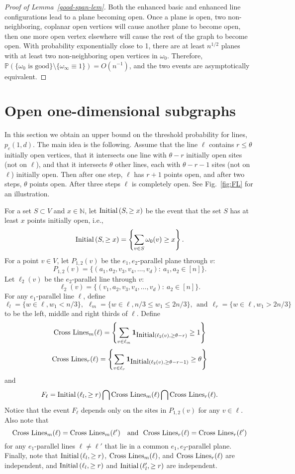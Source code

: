 \documentclass{amsart}
\newcommand{\one}{\mathbf{1}}
\newcommand{\prob}{\mathbb{P}}
\newcommand{\N}{\mathbb{N}}
\newcommand{\threshold}{\theta}
\newcommand{\noodle}{r}
\newcommand{\I}[2]{\hbox{Initial}\left(#1, \geq #2\right)}
\newcommand{\good}{\text{good}}
\newcommand{\Gone}[1]{\hbox{Cross Lines}_m(#1)}
\newcommand{\Gtwo}[1]{\hbox{Cross Lines}_r(#1)}
\numberwithin{equation}{section}
\newcommand{\Ln}{\ell}
\theoremstyle{definition}
\theoremstyle{remark}
\begin{document}
\begin{proof}[Proof of Lemma~\ref{good-span-lem}]
Both the enhanced basic and enhanced line configurations lead to a plane becoming open.  Once a plane is open, two non-neighboring, coplanar open vertices will cause another plane to become open, then one more open vertex elsewhere will cause the rest of the graph to become open.  With probability exponentially close to 1, there are at least $n^{1/2}$ planes with at least two non-neighboring open vertices in $\omega_0$.  Therefore, $\prob(\{\omega_0 \text{ is } \good\} \setminus \{\omega_\infty \equiv1\})= O(n^{-1})$, and the two events are asymptotically equivalent.
\end{proof}



\section{Open one-dimensional subgraphs} \label{lines}
In this section 
we obtain an upper bound on the threshold probability for lines, $p_c(1,d)$. The main idea is the following.  Assume that the line $\Ln$ contains  $\noodle \le \threshold$ initially open vertices, that it intersects one line with $\threshold-\noodle$ initially open sites (not on $\Ln$), and that it intersects $\threshold$ other lines, each with $\threshold - \noodle-1$ sites (not on $\Ln$) initially open. 
Then after one step, $\Ln$ has $\noodle +1$ points open, and after two steps, $\threshold$ points open. After three steps $\Ln$ is completely open. See Fig.~\ref{fig:FL} for an illustration.

 For a set $S \subset V$ and $x \in \N$, let $\I{S}{x}$ be the event that the set $S$ has at least $x$ points initially open, i.e.,
 $$\I{S}{x}= \left\{\sum_{v \in S}\omega_0(v) \geq x\right\}.$$
For a point $v \in V$, let $P_{1,2}(v)$ be the $e_1,e_2$-parallel plane through $v$:
$$P_{1,2}(v)=\{(a_1,a_2,v_3,v_4,\dots,v_d):\ a_1,a_2 \in [n]\}.$$
Let $\Ln_2(v)$ be the $e_2$-parallel line through $v$:
$$\Ln_2(v) = \{(v_1,a_2,v_3,v_4,\dots,v_d):\ a_2 \in [n]\}.$$
For any $e_1$-parallel line $\Ln$, define 
$$\Ln_l = \{w \in \Ln, w_1 < n/3\}, \ \ \Ln_m = \{w \in \Ln, n/3 \leq w_1 \leq 2n/3\}, \ \ \text{and} \ \ 
\Ln_r = \{w \in \Ln, w_1 > 2n/3\}$$ to be the left, middle and right thirds of $\Ln$. Define
$$\Gone{\Ln}=\left\{\sum_{v \in \Ln_m} \one_{\I{\Ln_2(v)}{\threshold-\noodle}} \geq 1\right\}$$
$$\Gtwo{\Ln}=\left\{\sum_{v \in \Ln_r} \one_{\I{\Ln_2(v)}{\threshold-\noodle-1}} \geq \threshold \right\}$$
and
$$F_\Ln=
\I{\Ln_l}{\noodle}\bigcap \Gone{\Ln}\bigcap \Gtwo{\Ln}
.$$
Notice that the event $F_\Ln$ depends only on the sites in $P_{1,2}(v)$ for any $v \in \Ln$.
Also note that
$$\Gone{\Ln}=\Gone{\Ln'} \ \ \text{ and} \ \ \Gtwo{\Ln}=\Gtwo{\Ln'}$$
for any $e_1$-parallel lines $\Ln \neq \Ln'$ that lie in a common $e_1,e_2$-parallel plane. Finally, note that $\I{\Ln_l}{\noodle}$,  $\Gone{\Ln}$, and $ \Gtwo{\Ln}$ are independent, and $\I{\Ln_l}{\noodle}$ and $\I{\Ln'_l}{\noodle}$ are independent.
\end{document}
